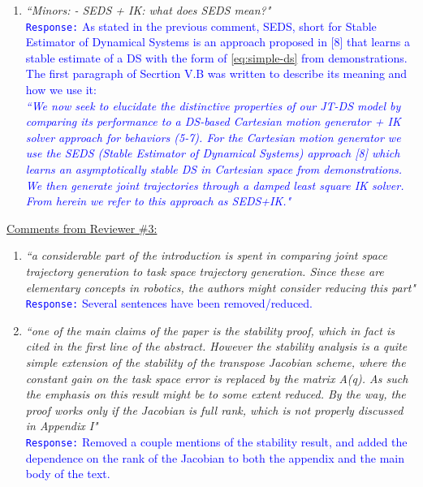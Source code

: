 \documentclass[10pt,stdletter,dateno]{newlfm}
\begin{document}
\begin{newlfm}
\begin{enumerate}
\item \textit{``Minors:
- SEDS + IK: what does SEDS mean?"}\\
\textcolor{blue}{\texttt{Response:} \small As stated in the previous comment, SEDS, short for Stable Estimator of Dynamical Systems is an approach proposed in [8] that learns a stable estimate of a DS with the form of \eqref{eq:simple-ds} from demonstrations. The first paragraph of Secrtion V.B was written to describe its meaning and how we use it:\\
\textit{``We now seek to elucidate the distinctive properties of our JT-DS model by comparing its performance to a DS-based Cartesian motion generator + IK solver approach for behaviors \textit{(5-7)}. For the Cartesian motion generator we use the SEDS (Stable Estimator of Dynamical Systems) approach [8] which learns an asymptotically stable DS in Cartesian space from demonstrations. We then generate joint trajectories through a damped least square IK solver. From herein we refer to this approach as SEDS+IK."}}\\


\end{enumerate}


\underline{Comments from Reviewer \#3:}
\begin{enumerate}
\item \textit{``a considerable part of the introduction is spent in comparing joint space trajectory generation to task
space trajectory generation. Since these are elementary concepts in robotics, the authors might consider
reducing this part"}\\
\textcolor{blue}{\texttt{Response:} \small Several sentences have been removed/reduced.}\\

\item \textit{``one of the main claims of the paper is the stability proof, which in fact is cited in the first line of the
abstract. However the stability analysis is a quite simple extension of the stability of the transpose
Jacobian scheme, where the constant gain on the task space error is replaced by the matrix A(q). As
such the emphasis on this result might be to some extent reduced. By the way, the proof works only
if the Jacobian is full rank, which is not properly discussed in Appendix I"}\\
\textcolor{blue}{\texttt{Response:} \small Removed a couple mentions of the stability result, and added the dependence on the rank of the Jacobian to both the appendix and the main body of the text.}\\


\end{enumerate}
\end{newlfm}
\end{document}
